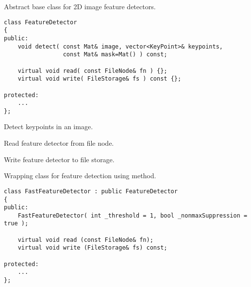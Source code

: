 Abstract base class for 2D image feature detectors.

\begin{lstlisting}
class FeatureDetector
{
public:
    void detect( const Mat& image, vector<KeyPoint>& keypoints, 
                 const Mat& mask=Mat() ) const;
                 
    virtual void read( const FileNode& fn ) {};
    virtual void write( FileStorage& fs ) const {};

protected:
    ...
};
\end{lstlisting}




Detect keypoints in an image.


\begin{description}
\end{description}

Read feature detector from file node.


\begin{description}
\end{description}

Write feature detector to file storage.


\begin{description}
\end{description}

Wrapping class for feature detection using  method.

\begin{lstlisting}
class FastFeatureDetector : public FeatureDetector
{
public:
    FastFeatureDetector( int _threshold = 1, bool _nonmaxSuppression = true );
    
    virtual void read (const FileNode& fn);
    virtual void write (FileStorage& fs) const;
    
protected:
	...
};
\end{lstlisting}

